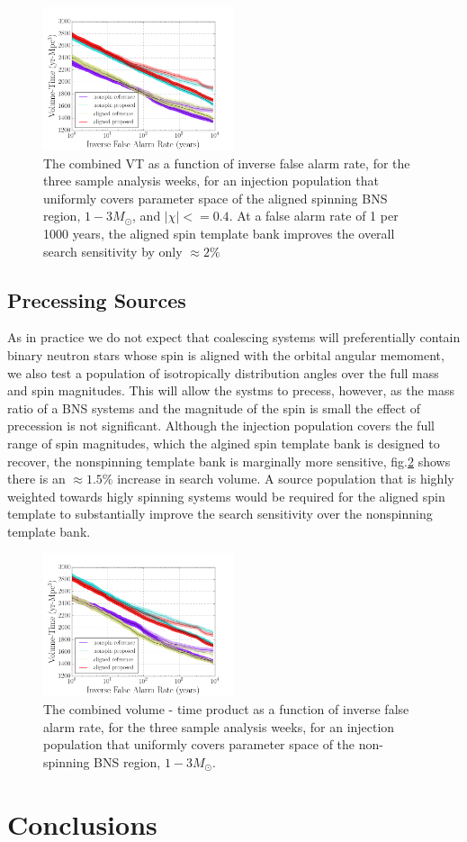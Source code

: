 \begin{figure}
\includegraphics[width=0.5\textwidth]{papers/bns_o1_dev/figures/aligned_combined.png}
\caption{\label{fig:aligned} 
The combined VT as a function of inverse false alarm rate, for the
three sample analysis weeks, for an injection population that uniformly covers parameter space of the aligned spinning BNS region, $1- 3M_\odot$, and $|\chi| <= 0.4$. At a false alarm rate of 1 per 1000 years, the aligned spin template bank improves the overall search sensitivity by only $\approx 2\%$
}
\end{figure}

\subsection{Precessing Sources}

As in practice we do not expect that coalescing systems will preferentially contain binary neutron stars whose spin is aligned with the orbital angular memoment, we also test a population of isotropically distribution angles over the full mass and spin magnitudes. This will allow the systms to precess, however, as the mass ratio of a BNS systems and the magnitude of the spin is small the effect of precession is not significant. Although the injection population covers the full range of spin magnitudes, which the algined spin template bank is designed to recover, the nonspinning template bank is marginally more sensitive,  fig.\ref{fig:prec} shows there is an $\approx 1.5\%$ increase in search volume. A source population that is highly weighted towards higly spinning systems would be required for the aligned spin template to substantially improve the search sensitivity over the nonspinning template bank. 

\begin{figure}
\includegraphics[width=0.5\textwidth]{papers/bns_o1_dev/figures/prec_combined.png}
\caption{\label{fig:prec} 
The combined volume - time product as a function of inverse false alarm rate, for the
three sample analysis weeks, for an injection population that uniformly covers parameter space of the non-spinning BNS region, $1- 3M_\odot$. 
}
\end{figure}




\section{Conclusions}
\label{sec:conclusions}
